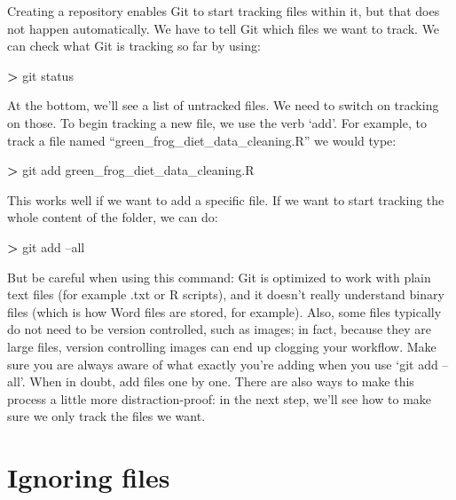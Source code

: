 \documentclass[
]{book}
\newenvironment{Shaded}{\begin{snugshade}}{\end{snugshade}}
\newcommand{\FunctionTok}[1]{\textcolor[rgb]{0.00,0.00,0.00}{#1}}
\newcommand{\NormalTok}[1]{#1}
\newcommand{\OperatorTok}[1]{\textcolor[rgb]{0.81,0.36,0.00}{\textbf{#1}}}
\begin{document}
Creating a repository enables Git to start tracking files within it, but that does not happen automatically. We have to tell Git which files we want to track. We can check what Git is tracking so far by using:

\begin{Shaded}
\begin{Highlighting}[]
\OperatorTok{>} \FunctionTok{git}\NormalTok{ status }
\end{Highlighting}
\end{Shaded}

At the bottom, we'll see a list of untracked files. We need to switch on tracking on those. To begin tracking a new file, we use the verb `add'. For example, to track a file named ``green\_frog\_diet\_data\_cleaning.R'' we would type:

\begin{Shaded}
\begin{Highlighting}[]
\OperatorTok{>} \FunctionTok{git}\NormalTok{ add green_frog_diet_data_cleaning.R}
\end{Highlighting}
\end{Shaded}

This works well if we want to add a specific file. If we want to start tracking the whole content of the folder, we can do:

\begin{Shaded}
\begin{Highlighting}[]
\OperatorTok{>} \FunctionTok{git}\NormalTok{ add --all}
\end{Highlighting}
\end{Shaded}

But be careful when using this command: Git is optimized to work with plain text files (for example .txt or R scripts), and it doesn't really understand binary files (which is how Word files are stored, for example). Also, some files typically do not need to be version controlled, such as images; in fact, because they are large files, version controlling images can end up clogging your workflow. Make sure you are always aware of what exactly you're adding when you use `git add --all'. When in doubt, add files one by one. There are also ways to make this process a little more distraction-proof: in the next step, we'll see how to make sure we only track the files we want.

\hypertarget{ignoring-files}{%
\section{Ignoring files}\label{ignoring-files}}
\end{document}
